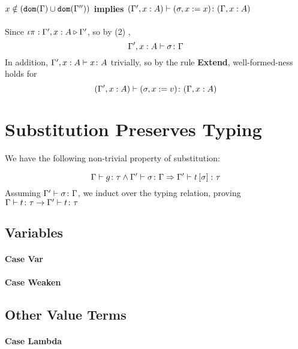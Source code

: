 {        \paragraph{$x \notin (\texttt{dom}(\Gamma) \cup \texttt{dom}(\Gamma''))$ implies $(\Gamma', x: A) \vdash (\sigma, x := x) \colon (\Gamma, x: A)$} 
        Since $\iota\pi : \Gamma',x: A \triangleright \Gamma'$, so by (2) , 
        $$\Gamma', x: A \vdash \sigma \colon \Gamma$$
        In addition, $\Gamma', x: A \vdash x \colon A$ trivially, so by the rule \textbf{Extend}, well-formed-ness holds for
        \begin{equation}
            (\Gamma', x:A) \vdash (\sigma, x:= v) \colon (\Gamma, x: A)
        \end{equation}
    

    \section{Substitution Preserves Typing}
    We have the following non-trivial property of substitution:

    \begin{equation}
        \Gamma \vdash g \colon \tau\wedge\Gamma' \vdash \sigma \colon \Gamma\Rightarrow\Gamma' \vdash t\left[\sigma\right] \colon \tau
    \end{equation}
    Assuming $\Gamma' \vdash \sigma \colon \Gamma$, we induct over the typing relation, proving $\Gamma \vdash t \colon \tau\rightarrow\Gamma' \vdash t \colon \tau$

    \subsection{Variables}  
        \paragraph{Case Var}
        \paragraph{Case Weaken}
            \todo{}
    \subsection{Other Value Terms}
    \paragraph{Case Lambda}
        \todo{}
}
